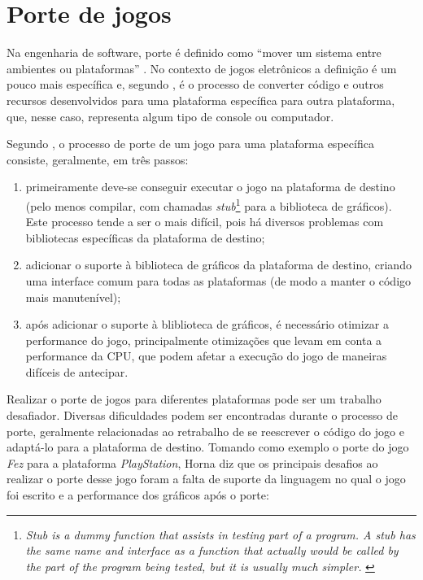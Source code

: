 \section{Porte de jogos}

Na engenharia de software, porte é definido como ``mover um sistema entre ambientes ou plataformas'' \cite{frakes}. No contexto de jogos eletrônicos a definição é um pouco mais específica e, segundo , é o processo de converter código e outros recursos desenvolvidos para uma plataforma específica para outra plataforma, que, nesse caso, representa algum tipo de console ou computador.

Segundo , o processo de porte de um jogo para uma plataforma específica consiste, geralmente, em três passos:

\begin{enumerate}
  \item primeiramente deve-se conseguir executar o jogo na plataforma de destino (pelo menos compilar, com chamadas \textit{stub}\footnote{\textit{Stub is a dummy function that assists in testing part of a program. A stub has the same name and interface as a function that actually would be called by the part of the program being tested, but it is usually much simpler.} \cite{dale}} para a biblioteca de gráficos). Este processo tende a ser o mais difícil, pois há diversos problemas com bibliotecas específicas da plataforma de destino;
  \item adicionar o suporte à biblioteca de gráficos da plataforma de destino, criando uma interface comum para todas as plataformas (de modo a manter o código mais manutenível);
  \item após adicionar o suporte à bliblioteca de gráficos, é necessário otimizar a performance do jogo, principalmente otimizações que levam em conta a performance da CPU, que podem afetar a execução do jogo de maneiras difíceis de antecipar.
\end{enumerate}

Realizar o porte de jogos para diferentes plataformas pode ser um trabalho desafiador. Diversas dificuldades podem ser encontradas durante o processo de porte, geralmente relacionadas ao retrabalho de se reescrever o código do jogo e adaptá-lo para a plataforma de destino. Tomando como exemplo o porte do jogo \textit{Fez} para a plataforma \textit{PlayStation}, Horna diz que os principais desafios ao realizar o porte desse jogo foram a falta de suporte da linguagem no qual o jogo foi escrito e a performance dos gráficos após o porte:


